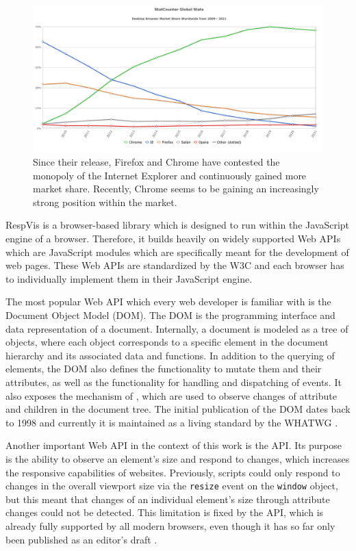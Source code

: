 \begin{figure}[tp]
\centering
\includegraphics[keepaspectratio,width=\linewidth,height=\fullh / 3]{diagrams/browser-market-share.pdf}
\caption[Desktop Browser Market Share]{
  Since their release, Firefox and Chrome have contested the monopoly of the Internet Explorer and continuously gained more market share. 
  Recently, Chrome seems to be gaining an increasingly strong position within the market. 
  }
\label{fig:BrowserMarketShare}
\end{figure}


RespVis is a browser-based library which is designed to run within the
JavaScript engine of a browser.  Therefore, it builds heavily on
widely supported Web APIs which are JavaScript modules which are
specifically meant for the development of web pages.  These Web APIs
are standardized by the W3C and each browser has to individually
implement them in their JavaScript engine.

The most popular Web API which every web developer is familiar with is
the Document Object Model (DOM).  The DOM is the programming interface
and data representation of a document.  Internally, a document is
modeled as a tree of objects, where each object corresponds to a
specific element in the document hierarchy and its associated data and
functions.  In addition to the querying of elements, the DOM also
defines the functionality to mutate them and their attributes, as well
as the functionality for handling and dispatching of events.  It also
exposes the mechanism of , which are used
to observe changes of attribute and children in the document tree.
The initial publication of the DOM dates back to 1998 \parencite{DOM1}
and currently it is maintained as a living standard by the WHATWG
\parencite{DOM}.

Another important Web API in the context of this work is the
 API.  Its purpose is the ability to observe
an element's size and respond to changes, which increases the
responsive capabilities of websites.  Previously, scripts could only
respond to changes in the overall viewport size via the
\lstinline{resize} event on the \lstinline{window} object, but this
meant that changes of an individual element's size through attribute
changes could not be detected.  This limitation is fixed by the
 API, which is already fully supported by all
modern browsers, even though it has so far only been published as an
editor's draft \parencite{ResizeObserver}.




